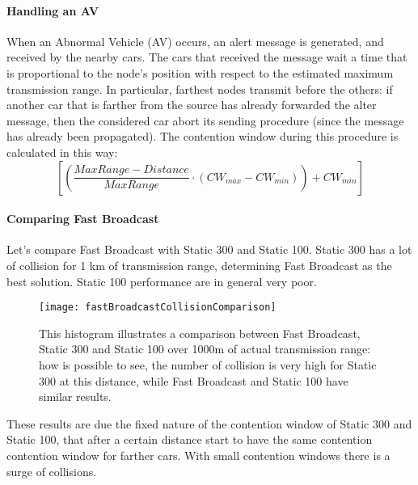 \paragraph*{Handling an AV} When an Abnormal Vehicle (AV) occurs, an alert
message is generated, and received by the nearby cars. The cars that received
the message wait a time that is proportional to the node's position with
respect to the estimated maximum transmission range. In particular, farthest
nodes transmit before the others: if another car that is farther from the source
has already forwarded the alter message, then the considered car abort its
sending procedure (since the message has already been propagated). The
contention window during this procedure is calculated in this way:
\begin{equation}
\left [ \left ( \frac{MaxRange - Distance}{MaxRange} \cdot (CW_{max} - CW_{min}) \right ) + CW_{min} \right ]
\end{equation}

\paragraph*{Comparing Fast Broadcast}
Let's compare Fast Broadcast with Static 300 and Static 100. Static 300 has a
lot of collision for 1 km of transmission range, determining Fast Broadcast as
the best solution. Static 100 performance are in general very poor.

\begin{figure}[t]
  \centering
  \texttt{[image: fastBroadcastCollisionComparison]}
  \caption[Fast broadcast comparison]{This histogram illustrates a comparison
    between Fast Broadcast, Static 300 and Static 100 over 1000m of actual
    transmission range: how is possible to see, the number of collision is very
    high for Static 300 at this distance, while Fast Broadcast and Static 100
    have similar results.}
  \label{fig:802.11ws:fastBroadCastComparison}
\end{figure}

These results are due the fixed nature of the contention window of Static 300
and Static 100, that after a certain distance start to have the same contention
contention window for farther cars. With small contention windows there is a
surge of collisions.
